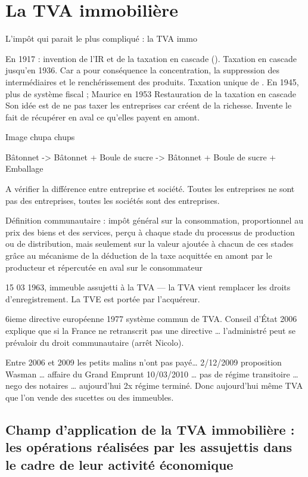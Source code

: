 
\chapter{La TVA immobilière}

L’impôt qui parait le plus compliqué : la TVA immo


En 1917 : invention de l’IR et de la taxation en cascade (). Taxation en cascade jusqu’en 1936. Car a pour conséquence la concentration, la suppression des intermédiaires et le renchérissement des produits. Taxation unique de . En 1945, plus de système fiscal ; Maurice  en 1953 Restauration de la taxation en cascade Son idée est de ne pas taxer les entreprises car créent de la richesse. Invente le fait de récupérer en aval ce qu’elles payent en amont.


Image chupa chups


Bâtonnet -> Bâtonnet + Boule de sucre -> Bâtonnet + Boule de sucre + Emballage


A vérifier la différence entre entreprise et société. Toutes les entreprises ne sont pas des entreprises, toutes les sociétés sont des entreprises.


Définition communautaire : impôt général sur la consommation, proportionnel au prix des biens et des services, perçu à chaque stade du processus de production ou de distribution, mais seulement sur la valeur ajoutée à chacun de ces stades grâce au mécanisme de la déduction de la taxe acquittée en amont par le producteur et répercutée en aval sur le consommateur


15 03 1963, immeuble assujetti à la TVA --- la TVA vient remplacer les droits d’enregistrement. La TVE est portée par l’acquéreur.


6ieme directive européenne 1977 système commun de TVA. Conseil d’État 2006 explique que si la France ne retranscrit pas une directive … l’administré peut se prévaloir du droit communautaire (arrêt Nicolo).

Entre 2006 et 2009 les petits malins n’ont pas payé… 2/12/2009 proposition Wasman … affaire du Grand Emprunt 10/03/2010 … pas de régime transitoire … nego des notaires … aujourd’hui 2x régime terminé. Donc aujourd’hui même TVA que l’on vende des sucettes ou des immeubles.



\section{Champ d’application de la TVA immobilière : les opérations réalisées par les assujettis dans le cadre de leur activité économique}

